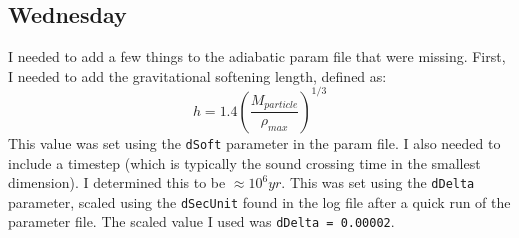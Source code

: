 \documentclass[11pt,letterpaper]{article}
\begin{document}
\subsection*{Wednesday}
I needed to add a few things to the adiabatic param file that were missing.  
First, I needed to add the gravitational softening length, defined as:
$$h=1.4(\frac{M_{particle}}{\rho_{max}})^{1/3}$$
This value was set using the \verb!dSoft! parameter in the param file.  I also 
needed to include a timestep (which is typically the sound crossing time in the 
smallest dimension).  I determined this to be $\approx10^6yr$. This was set 
using the \verb!dDelta! parameter, scaled using the \verb!dSecUnit! found in
the log file after a quick run of the parameter file.  The scaled value I used
was \verb!dDelta = 0.00002!.
\end{document}
